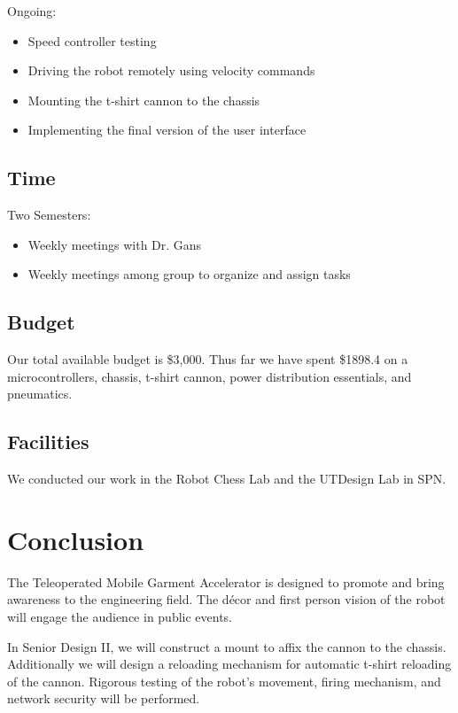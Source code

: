 \documentclass[letterpaper,12pt]{article}
\begin{document}
\noindent Ongoing:
\begin{itemize}
    \item Speed controller testing
    \item Driving the robot remotely using velocity commands
    \item Mounting the t-shirt cannon to the chassis
    \item Implementing the final version of the user interface
\end{itemize}

\subsection{Time}
\noindent Two Semesters:
\begin{itemize}
    \item Weekly meetings with Dr. Gans
    \item Weekly meetings among group to organize and assign tasks
\end{itemize}

\subsection{Budget}
\noindent Our total available budget is \$3,000. Thus far we have spent \$1898.4 on a microcontrollers, chassis, t-shirt cannon, power distribution essentials, and pneumatics.

\subsection{Facilities}
\noindent We conducted our work in the Robot Chess Lab and the UTDesign Lab in SPN.

\section{Conclusion}
\noindent The Teleoperated Mobile Garment Accelerator is designed to promote and bring awareness to the engineering field. The décor and first person vision of the robot will engage the audience in public events.\newline

\noindent In Senior Design II, we will construct a mount to affix the cannon to the chassis. Additionally we will design a reloading mechanism for automatic t-shirt reloading of the cannon. Rigorous testing of the robot’s movement, firing mechanism, and network security will be performed.
\end{document}
